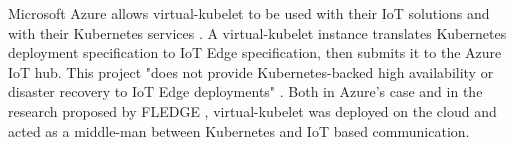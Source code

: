 Microsoft Azure allows virtual-kubelet to be used with their IoT solutions and with their Kubernetes services \cite{Chandra2019}. A virtual-kubelet instance translates Kubernetes deployment specification to IoT Edge specification, then submits it to the Azure IoT hub. This project "does not provide Kubernetes-backed high availability or disaster recovery to IoT Edge deployments" \cite{azure-vk-github}. Both in Azure's case and in the research proposed by FLEDGE \cite{fledge}, virtual-kubelet was deployed on the cloud and acted as a middle-man between Kubernetes and IoT based communication.